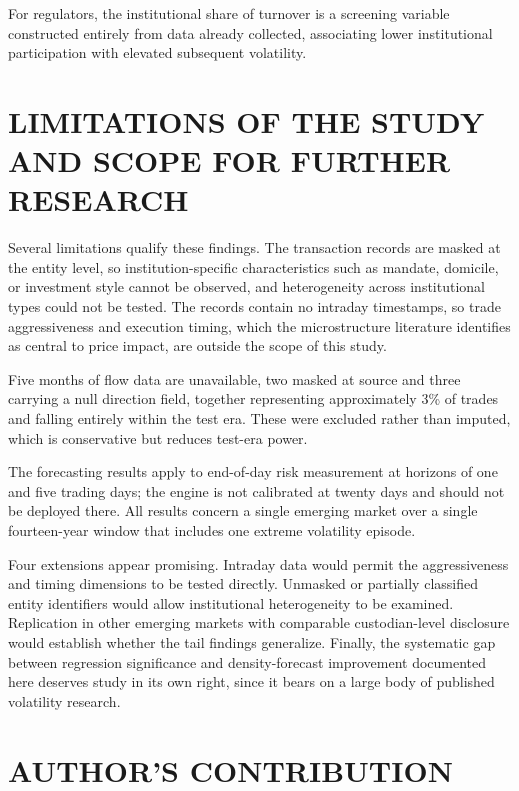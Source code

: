 \documentclass[12pt]{article}
\begin{document}
For regulators, the institutional share of turnover is a screening variable
constructed entirely from data already collected, associating lower
institutional participation with elevated subsequent volatility.

\section*{LIMITATIONS OF THE STUDY AND SCOPE FOR FURTHER RESEARCH}

Several limitations qualify these findings. The transaction records are masked
at the entity level, so institution-specific characteristics such as mandate,
domicile, or investment style cannot be observed, and heterogeneity across
institutional types could not be tested. The records contain no intraday
timestamps, so trade aggressiveness and execution timing, which the
microstructure literature identifies as central to price impact, are outside
the scope of this study.

Five months of flow data are unavailable, two masked at source and three
carrying a null direction field, together representing approximately 3\% of
trades and falling entirely within the test era. These were excluded rather
than imputed, which is conservative but reduces test-era power.

The forecasting results apply to end-of-day risk measurement at horizons of
one and five trading days; the engine is not calibrated at twenty days and
should not be deployed there. All results concern a single emerging market
over a single fourteen-year window that includes one extreme volatility
episode.

Four extensions appear promising. Intraday data would permit the
aggressiveness and timing dimensions to be tested directly. Unmasked or
partially classified entity identifiers would allow institutional
heterogeneity to be examined. Replication in other emerging markets with
comparable custodian-level disclosure would establish whether the tail
findings generalize. Finally, the systematic gap between regression
significance and density-forecast improvement documented here deserves study
in its own right, since it bears on a large body of published volatility
research.

\section*{AUTHOR'S CONTRIBUTION}
\end{document}
